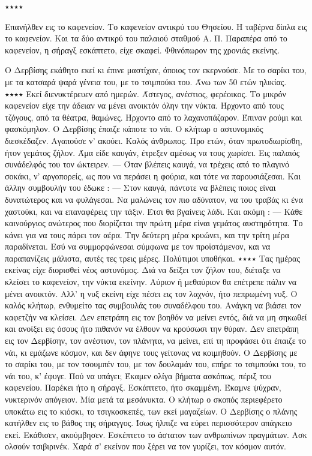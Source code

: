\documentclass{article}
\begin{document}
٭٭٭٭

Επανήλθεν εις το καφενείον. Το καφενείον αντικρύ του Θησείου. Η ταβέρνα δίπλα εις το καφενείον. Και τα δύο αντικρύ του παλαιού σταθμού Α. Π. Παραπέρα από το καφενείον,  η σήραγξ εσκάπτετο, είχε σκαφεί. Φθινόπωρον της χρονιάς εκείνης.


Ο Δερβίσης εκάθητο εκεί κι έπινε μαστίχαν, όποιος τον εκερνούσε. Με το σαρίκι του, με τα κατσαρά ψαρά γένεια του, με το τσιμπούκι του. Άνω των 50 ετών ηλικίας.
٭٭٭٭
Εκεί διενυκτέρευεν από ημερών. Άστεγος, ανέστιος, φερέοικος. Το μικρόν καφενείον είχε την άδειαν να μένει ανοικτόν όλην την νύκτα.
Ήρχοντο από τους τζόγους, από τα θέατρα, θαμώνες. Ήρχοντο από το λαχανοπάζαρον. Έπιναν ρούμι και φασκόμηλον.
Ο Δερβίσης έπαιζε κάποτε το νάι. Ο κλήτωρ ο αστυνομικός διεσκέδαζεν. Αγαπούσε ν’ ακούει.
Καλός άνθρωπος. Προ ετών, όταν πρωτοδιωρίσθη, ήτον γεμάτος ζήλον.
Άμα είδε καυγάν, έτρεξεν αμέσως να τους χωρίσει. Εις παλαιός συνάδελφός του τον ώκτειρεν.
— Όταν βλέπεις καυγά, να τρέχεις από το πλαγινό σοκάκι, ν’ αργοπορείς, ως που να περάσει η φούρια, και τότε να παρουσιάζεσαι.
Και άλλην συμβουλήν του έδωκε :
— Στον καυγά, πάντοτε να βλέπεις ποιος είναι δυνατώτερος και να φυλάγεσαι. Να μαλώνεις τον πιο αδύνατον, να του τραβάς κι ένα χαστούκι, και να επαναφέρεις την τάξιν. Έτσι θα βγαίνεις λάδι.
Και ακόμη :
— Κάθε καινούργιος ανώτερος που διορίζεται την πρώτη μέρα είναι γεμάτος αυστηρότητα. Το κάνει για να τους πάρει τον αέρα. Την δεύτερη μέρα κρυώνει, και την τρίτη μέρα παραδίνεται. Εσύ να συμμορφώνεσαι σύμφωνα με τον προϊστάμενον, και να παραπανίζεις μάλιστα, αυτές τες τρεις μέρες.
Πολύτιμοι υποθήκαι.
٭٭٭٭
Τας ημέρας εκείνας είχε διορισθεί νέος αστυνόμος.
Διά να δείξει τον ζήλον του, διέταξε να κλείσει το καφενείον, την νύκτα εκείνην.
Αύριον ή μεθαύριον θα επέτρεπε πάλιν  να μένει ανοικτόν. Αλλ’ η νυξ εκείνη είχε πέσει εις τον λαχνόν, ήτο πεπρωμένη νυξ.
Ο καλός κλήτωρ, ενθυμείτο τας συμβουλάς του συναδέλφου του. Ανάγκη να βιάσει τον καφετζήν να κλείσει. Δεν επετράπη εις τον βοηθόν να μείνει εντός, διά να μη σηκωθεί και ανοίξει εις όσους ήτο πιθανόν να έλθουν να κρούσωσι την θύραν. Δεν επετράπη εις τον Δερβίσην, τον ανέστιον, τον πλάνητα, να μείνει, επί τη προφάσει ότι έπαιζε το νάι, κι εμάζωνε κόσμον, και δεν άφηνε τους γείτονας να κοιμηθούν. Ο Δερβίσης με το σαρίκι του, με τον τσουμπέν του, με τον δουλαμάν  του, επήρε το τσιμπούκι του, το νάι του, κ’ έφυγε.
Πού να υπάγει;
Έκαμεν ολίγα βήματα ασκόπως, πέριξ του καφενείου.
Παρέκει ήτο η σήραγξ. Εσκάπτετο, ήτο σκαμμένη.
Έκαμνε ψύχραν, νυκτερινόν απόγειον. Μία μετά τα μεσάνυκτα.
Ο κλήτωρ ο σκοπός περιεφέρετο υποκάτω εις το κιόσκι, το τσιγκοσκεπές, των εκεί μαγαζείων.
Ο Δερβίσης ο πλάνης κατήλθεν εις το βάθος της σήραγγος. Ίσως ήλπιζε να εύρει περισσότερον απάγκειο εκεί.
Εκάθισεν, ακούμβησεν.
Εσκέπτετο το άστατον των ανθρωπίνων πραγμάτων. Ασκ ολσούν τσιβιρινέκ.  Χαρά σ’ εκείνον που ξέρει να τον γυρίζει, τον κόσμον αυτόν.
\end{document}
